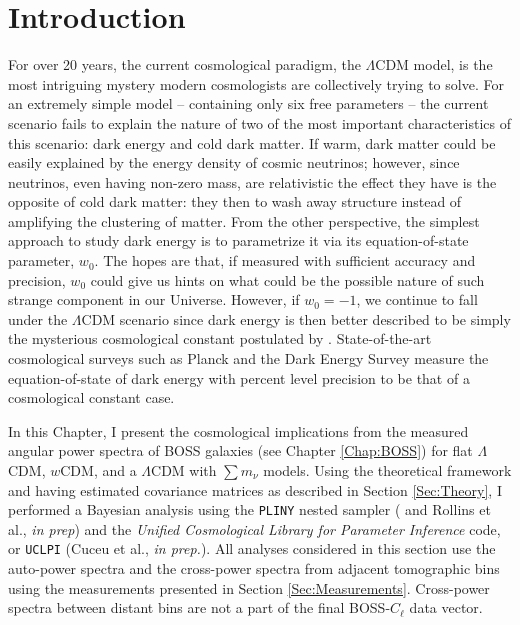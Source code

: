 \section{Introduction}
For over 20 years, the current cosmological paradigm, the $\Lambda$CDM model, is the most intriguing mystery modern cosmologists are collectively trying to solve. For an extremely simple model -- containing only six free parameters -- the current scenario fails to explain the nature of two of the most important characteristics of this scenario: dark energy and cold dark matter. If warm, dark matter could be easily explained by the energy density of cosmic neutrinos; however, since neutrinos, even having non-zero mass, are relativistic the effect they have is the opposite of cold dark matter: they then to wash away structure instead of amplifying the clustering of matter. From the other perspective, the simplest approach to study dark energy is to parametrize it via its equation-of-state parameter, $w_0$. The hopes are that, if measured with sufficient accuracy and precision, $w_0$ could give us hints on what could be the possible nature of such strange component in our Universe. However, if $w_0 = -1$, we continue to fall under the $\Lambda$CDM scenario since dark energy is then better described to be simply the mysterious cosmological constant postulated by \cite{1917Einstein}. State-of-the-art cosmological surveys such as Planck \citep{PlanckCosmology2016,2018PlanckCosmology} and the Dark Energy Survey \citep{2017arXiv170801530D} measure the equation-of-state of dark energy with percent level precision to be that of a cosmological constant case.

\qquad In this Chapter, I present the cosmological implications from the measured angular power spectra of BOSS galaxies (see Chapter \ref{Chap:BOSS}) for flat $\Lambda$CDM, $w$CDM, and a $\Lambda$CDM with $\sum m_{\nu}$ models. Using the theoretical framework and having estimated covariance matrices as described in Section \ref{Sec:Theory}, I performed a Bayesian analysis using the \texttt{PLINY} nested sampler ( \citealt{PlinyRichardThesis} and Rollins et al., \textit{in prep}) and the \textit{Unified Cosmological Library for Parameter Inference} code, or \texttt{UCLPI} (Cuceu et al., \textit{in prep.}). All analyses considered in this section use the auto-power spectra and the cross-power spectra from adjacent tomographic bins using the measurements presented in Section \ref{Sec:Measurements}. Cross-power spectra between distant bins are not a part of the final BOSS-$C_{\ell}$ data vector.

